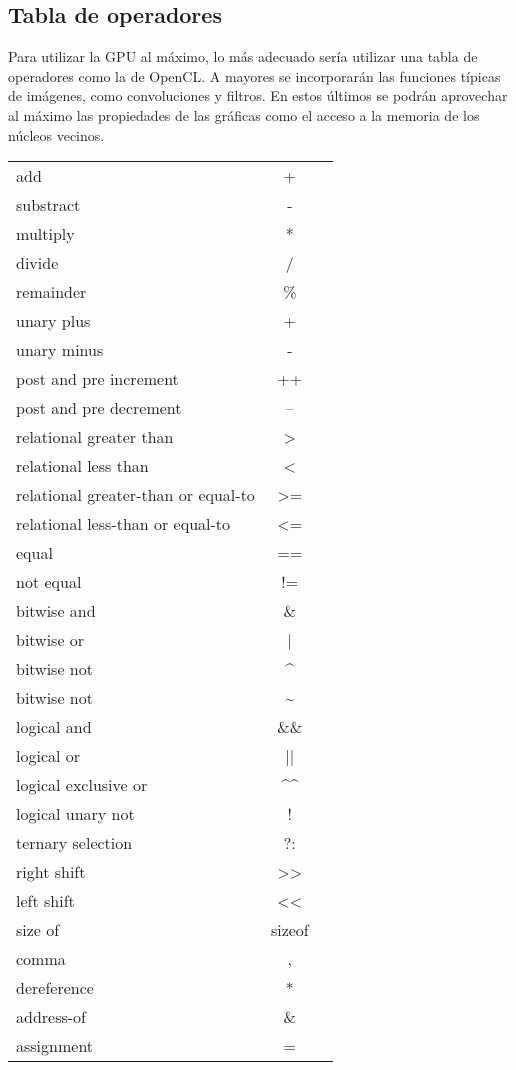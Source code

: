 \documentclass[12pt,a4paper]{article}
\begin{document}
\subsection
{Tabla de operadores}
Para utilizar la GPU al máximo, lo más adecuado sería utilizar una tabla de
operadores como la de OpenCL. A mayores se incorporarán las funciones típicas de
imágenes, como convoluciones y filtros. En estos últimos se podrán aprovechar al
máximo las propiedades de las gráficas como el acceso a la memoria de los
núcleos vecinos.
\\
\begin{center}
\begin{tabular}{ l c r }
  add & + \\
  substract & - \\
  multiply & * \\
  divide &  / \\
  remainder &\% \\
  unary plus & + \\
  unary minus & - \\
  post and pre increment & ++\\
  post and pre decrement& --\\
  relational greater than & \textgreater \\
  relational less than & \textless \\
  relational greater-than or equal-to & \textgreater = \\
  relational less-than or equal-to & \textless= \\
  equal & == \\
  not equal  & != \\
  bitwise and & \& \\
  bitwise or &  | \\
  bitwise not & \textasciicircum \\
  bitwise not & \textasciitilde \\
  logical and & \&\& \\
  logical or & || \\
  logical exclusive or & \textasciicircum\textasciicircum \\
  logical unary not & ! \\
  ternary selection & ?: \\
  right shift & \textgreater\textgreater \\
  left shift & \textless\textless \\
  size of & sizeof \\
  comma &, \\
  dereference & * \\
  address-of & \& \\
  assignment & = \\	
\end{tabular}
\end{center}
\end{document}
